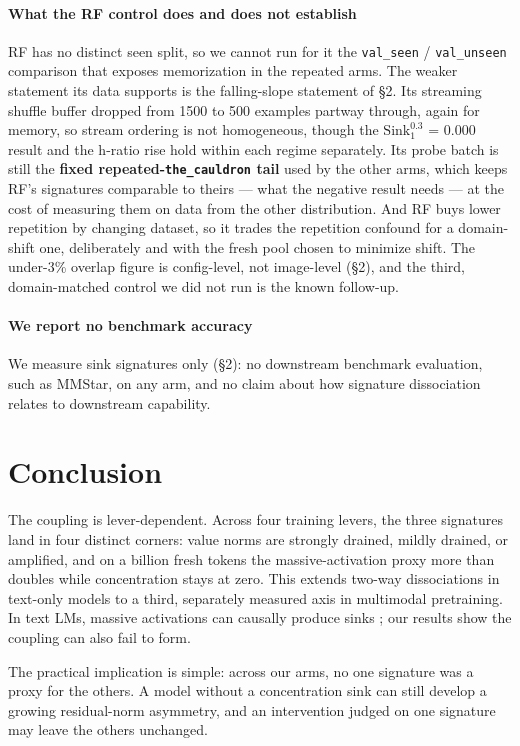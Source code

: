 \documentclass{article}
\begin{document}
\paragraph{What the RF control does and does not establish} RF has no distinct seen split, so we cannot run for it the \texttt{val\_seen} / \texttt{val\_unseen} comparison that exposes memorization in the repeated arms. The weaker statement its data supports is the falling-slope statement of \S2. Its streaming shuffle buffer dropped from 1500 to 500 examples partway through, again for memory, so stream ordering is not homogeneous, though the $\mathrm{Sink}^{0.3}_{1}$ = 0.000 result and the h-ratio rise hold within each regime separately. Its probe batch is still the \textbf{fixed repeated-\texttt{the\_cauldron} tail} used by the other arms, which keeps RF's signatures comparable to theirs --- what the negative result needs --- at the cost of measuring them on data from the other distribution. And RF buys lower repetition by changing dataset, so it trades the repetition confound for a domain-shift one, deliberately and with the fresh pool chosen to minimize shift. The under-3\% overlap figure is config-level, not image-level (\S2), and the third, domain-matched control we did not run is the known follow-up.

\paragraph{We report no benchmark accuracy} We measure sink signatures only (\S2): no downstream benchmark evaluation, such as MMStar, on any arm, and no claim about how signature dissociation relates to downstream capability.

\section{Conclusion}

The coupling is lever-dependent. Across four training levers, the three signatures land in four distinct corners: value norms are strongly drained, mildly drained, or amplified, and on a billion fresh tokens the massive-activation proxy more than doubles while concentration stays at zero. This extends two-way dissociations in text-only models \cite{ref9,ref10} to a third, separately measured axis in multimodal pretraining. In text LMs, massive activations can causally produce sinks \cite{ref7}; our results show the coupling can also fail to form.

The practical implication is simple: across our arms, no one signature was a proxy for the others. A model without a concentration sink can still develop a growing residual-norm asymmetry, and an intervention judged on one signature may leave the others unchanged.
\end{document}
